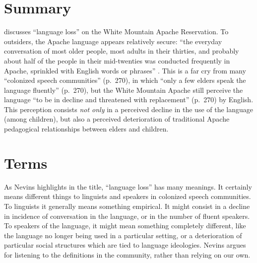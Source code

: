 \documentclass[man,12pt,natbib]{apa6}
\begin{document}

\section{Summary}

\citet{Nevins04} discusses ``language loss'' on the White Mountain Apache
Reservation. To outsiders, the Apache language appears relatively secure: ``the
everyday conversation of most older people, most adults in their thirties, and
probably about half of the people in their mid-twenties was conducted
frequently in Apache, sprinkled with English words or phrases''
\citep[p.~270]{Nevins04}. This is a far cry from many ``colonized speech
communities'' (p.~270), in which ``only a few elders speak the language
fluently'' (p.~270), but the White Mountain Apache still perceive the language
``to be in decline and threatened with replacement'' (p.~270) by English. This
perception consists \emph{not only} in a perceived decline in the use of the
language (among children), but also a perceived deterioration of traditional
Apache pedagogical relationships between elders and children.


\section{Terms}

As Nevins highlights in the title, ``language loss'' has many meanings. It
certainly means different things to linguists and speakers in colonized speech
communities.  To linguists it generally means something empirical. It might
consist in a decline in incidence of conversation in the language, or in the
number of fluent speakers. To speakers of the language, it might mean something
completely different, like the language no longer being used in a particular
setting, or a deterioration of particular social structures which are tied to
language ideologies. Nevins argues for listening to the definitions in the
community, rather than relying on our own.
\end{document}
